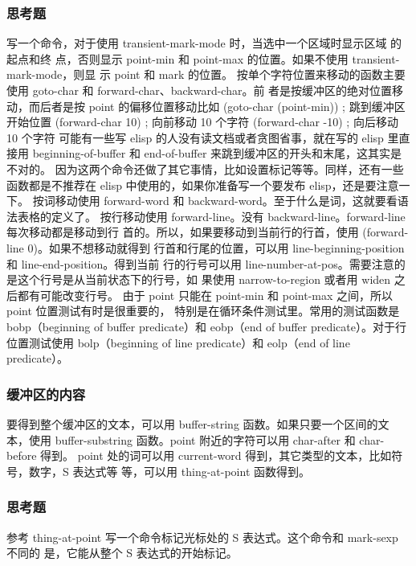 \documentclass[11pt]{ctexart}
\begin{document}
{{{{\subsubsection{思考题}
\label{sec:orgad0afc4}
写一个命令，对于使用 transient-mark-mode 时，当选中一个区域时显示区域 的起点和终
点，否则显示 point-min 和 point-max 的位置。如果不使用 transient-mark-mode，则显
示 point 和 mark 的位置。
按单个字符位置来移动的函数主要使用 goto-char 和 forward-char、backward-char。前
者是按缓冲区的绝对位置移动，而后者是按 point 的偏移位置移动比如
(goto-char (point-min))                   ; 跳到缓冲区开始位置
(forward-char 10)                         ; 向前移动 10 个字符
(forward-char -10)                        ; 向后移动 10 个字符
可能有一些写 elisp 的人没有读文档或者贪图省事，就在写的 elisp 里直接用
beginning-of-buffer 和 end-of-buffer 来跳到缓冲区的开头和末尾，这其实是不对的。
因为这两个命令还做了其它事情，比如设置标记等等。同样，还有一些函数都是不推荐在
elisp 中使用的，如果你准备写一个要发布 elisp，还是要注意一下。
按词移动使用 forward-word 和 backward-word。至于什么是词，这就要看语法表格的定义了。
按行移动使用 forward-line。没有 backward-line。forward-line 每次移动都是移动到行
首的。所以，如果要移动到当前行的行首，使用 (forward-line 0)。如果不想移动就得到
行首和行尾的位置，可以用 line-beginning-position 和 line-end-position。得到当前
行的行号可以用 line-number-at-pos。需要注意的是这个行号是从当前状态下的行号，如
果使用 narrow-to-region 或者用 widen 之后都有可能改变行号。
由于 point 只能在 point-min 和 point-max 之间，所以 point 位置测试有时是很重要的，
特别是在循环条件测试里。常用的测试函数是 bobp（beginning of buffer predicate）和
eobp（end of buffer predicate）。对于行位置测试使用 bolp（beginning of line
predicate）和 eolp（end of line predicate）。
\subsubsection{缓冲区的内容}
\label{sec:orgc9834b0}
要得到整个缓冲区的文本，可以用 buffer-string 函数。如果只要一个区间的文本，使用
buffer-substring 函数。point 附近的字符可以用 char-after 和 char-before 得到。
point 处的词可以用 current-word 得到，其它类型的文本，比如符号，数字，S 表达式等
等，可以用 thing-at-point 函数得到。
\subsubsection{思考题}
\label{sec:org75900f1}
参考 thing-at-point 写一个命令标记光标处的 S 表达式。这个命令和 mark-sexp 不同的
是，它能从整个 S 表达式的开始标记。
}}}}
\end{document}
